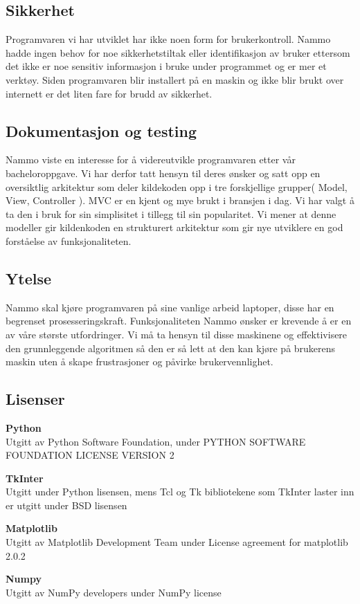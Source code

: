 \subsection{Sikkerhet}
Programvaren vi har utviklet har ikke noen form for brukerkontroll. Nammo hadde ingen behov for noe sikkerhetstiltak eller identifikasjon av bruker ettersom det ikke er noe sensitiv informasjon i bruke under programmet og er mer et verktøy. Siden programvaren blir installert på en maskin og ikke blir brukt over internett er det liten fare for brudd av sikkerhet.

\subsection{Dokumentasjon og testing}
Nammo viste en interesse for å videreutvikle programvaren etter vår bacheloroppgave. Vi har derfor tatt hensyn til deres ønsker og satt opp en oversiktlig arkitektur som deler kildekoden opp i tre forskjellige grupper( Model, View, Controller ). MVC er en kjent og mye brukt i bransjen i dag. Vi har valgt å ta den i bruk for sin simplisitet i tillegg til sin popularitet. Vi mener at denne modeller gir kildenkoden en strukturert arkitektur som gir nye utviklere en god forståelse av funksjonaliteten.

	\subsection{Ytelse}
Nammo skal kjøre programvaren på sine vanlige arbeid laptoper, disse har en begrenset prosesseringskraft. Funksjonaliteten Nammo ønsker er krevende å er en av våre største utfordringer. Vi må ta hensyn til disse maskinene og effektivisere den grunnleggende algoritmen så den er så lett at den kan kjøre på brukerens maskin uten å skape frustrasjoner og påvirke brukervennlighet.

\subsection{Lisenser}
\begin{description}

\item \textbf{Python}\\
Utgitt av Python Software Foundation, under PYTHON SOFTWARE FOUNDATION LICENSE VERSION 2\cite{Python}
\item \textbf{TkInter}\\
Utgitt under Python lisensen, mens Tcl og Tk bibliotekene som TkInter laster inn er utgitt under BSD lisensen\cite{TkInter}
\item \textbf{Matplotlib}\\
Utgitt av Matplotlib Development Team under License agreement for matplotlib 2.0.2\cite{Matplotlib}
\item \textbf{Numpy}\\
Utgitt av NumPy developers under NumPy license\cite{Numpy}
\end{description}